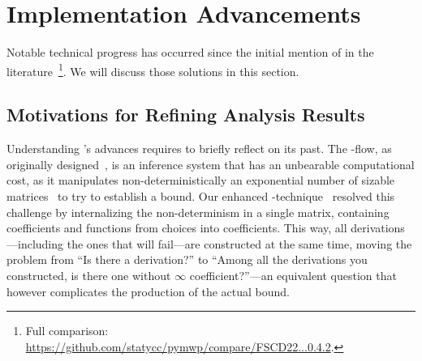 \documentclass[runningheads]{llncs}
\begin{document}
\section{Implementation Advancements}
\label{sec:solutions}

Notable technical progress has occurred since the initial mention of \pymwp in the literature~\cite{Aubert2022b}\footnote{%
Full comparison: \url{https://github.com/statycc/pymwp/compare/FSCD22...0.4.2}.}. %
We will discuss those solutions in this section.

\subsection{Motivations for Refining Analysis Results}
\label{subsec:refinement}

Understanding \pymwp's advances requires to briefly reflect on its past.
The \mwp-flow, as originally designed~\cite{Jones2009}, is an inference system that has an unbearable computational cost, as it manipulates non-deterministically an exponential number of sizable matrices~\cite[Sect.~2.3]{Aubert2022b} to try to establish a bound.
Our enhanced \mwp-technique~\cite{Aubert2022b} resolved this challenge %
by internalizing the non-determinism in a single matrix, containing coefficients and functions from choices into coefficients.
This way, all derivations---including the ones that will fail---are constructed at the same time, moving the problem from \enquote{Is there a derivation?} to \enquote{Among all the derivations you constructed, is there one without \(\infty\) coefficient?}---an equivalent question that however complicates the production of the actual bound.



\end{document}
